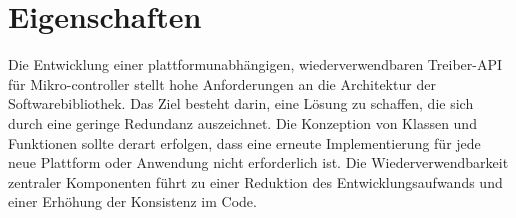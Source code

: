 \section{Eigenschaften}

Die Entwicklung einer plattformunabhängigen, wiederverwendbaren Treiber-API für Mikro-controller stellt hohe Anforderungen an die Architektur der Softwarebibliothek.
Das Ziel besteht darin, eine Lösung zu schaffen, die sich durch eine geringe Redundanz auszeichnet. 
Die Konzeption von Klassen und Funktionen sollte derart erfolgen, dass eine erneute Implementierung für jede neue Plattform oder Anwendung nicht erforderlich ist.
Die Wiederverwendbarkeit zentraler Komponenten führt zu einer Reduktion des Entwicklungsaufwands und einer Erhöhung der Konsistenz im Code.

